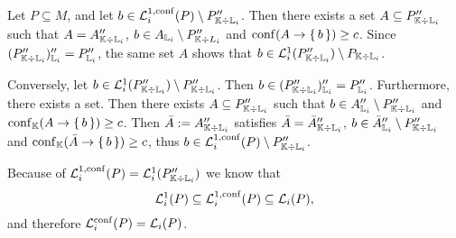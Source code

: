 \begin{Proof}
  Let $P \subseteq M$, and let $b \in \mathcal{L}_{i}^{1,\operatorname{conf}}(P) \setminus P_{{\mathbb{K}}
    \div {\ensuremath{\mathbb{L}}}_{i}}''$.  Then there exists a set $A \subseteq P_{{\mathbb{K}} \div {\ensuremath{\mathbb{L}}}_{i}}''$ such that $A = A_{{\mathbb{K}} \div {\ensuremath{\mathbb{L}}}_{i}}''$, $b \in A_{{\mathbb{L}}_{i}}
  \setminus P_{{\mathbb{K}} \div L_{i}}''$ and $\operatorname{conf} (A \to {\ensuremath{\{\,b\,\}}}) \ge c$.  Since $(P_{{\mathbb{K}}
    \div {\ensuremath{\mathbb{L}}}_{i}}'')_{{\mathbb{L}}_{i}}'' = P_{{\mathbb{L}}_{i}}''$, the same set $A$ shows that $b
  \in \mathcal{L}_{i}^{1}(P_{{\mathbb{K}} \div {\ensuremath{\mathbb{L}}}_{i}}'') \setminus P_{{\mathbb{K}} \div {\ensuremath{\mathbb{L}}}_{i}}$.

  Conversely, let $b \in \mathcal{L}_{i}^{1}(P_{{\mathbb{K}} \div {\ensuremath{\mathbb{L}}}_{i}}'') \setminus
  P_{{\mathbb{K}} \div {\ensuremath{\mathbb{L}}}_{i}}''$.  Then $b \in (P_{{\mathbb{K}} \div {\ensuremath{\mathbb{L}}}_{i}}'')_{{\mathbb{L}}_{i}}'' = P_{{\mathbb{L}}_{i}}''$.  Furthermore, there exists a set.  Then there exists $A
  \subseteq P_{{\mathbb{K}} \div {\ensuremath{\mathbb{L}}}_{i}}''$ such that $b \in A_{{\mathbb{L}}_{i}}'' \setminus
  P_{{\mathbb{K}} \div {\ensuremath{\mathbb{L}}}_{i}}''$ and $\operatorname{conf}_{{\mathbb{K}}}(A \to {\ensuremath{\{\, b \,\}}}) \ge c$.  Then $\bar A
  := A_{{\mathbb{K}} \div {\ensuremath{\mathbb{L}}}_{i}}''$ satisfies $\bar A = \bar A_{{\mathbb{K}} \div {\ensuremath{\mathbb{L}}}_{i}}''$,
  $b \in \bar A_{{\mathbb{L}}_{i}}'' \setminus P_{{\mathbb{K}} \div {\ensuremath{\mathbb{L}}}_{i}}''$ and $\operatorname{conf}_{{\mathbb{K}}}(\bar A \to {\ensuremath{\{\,b\,\}}}) \ge c$, thus $b \in \mathcal{L}_{i}^{1,\operatorname{conf}}(P)\setminus
  P_{{\mathbb{K}} \div {\ensuremath{\mathbb{L}}}_{i}}''$.

  Because of $\mathcal{L}_{i}^{1,\operatorname{conf}}(P) = \mathcal{L}_{i}^{1}(P_{{\mathbb{K}} \div {\ensuremath{\mathbb{L}}}_{i}}'')$ we know that
  \begin{equation*}
    \mathcal{L}_{i}^{1}(P) \subseteq \mathcal{L}_{i}^{1,\operatorname{conf}}(P) \subseteq \mathcal{L}_{i}(P),
  \end{equation*}
  and therefore $\mathcal{L}_{i}^{\operatorname{conf}}(P) = \mathcal{L}_{i}(P)$.
\end{Proof}

